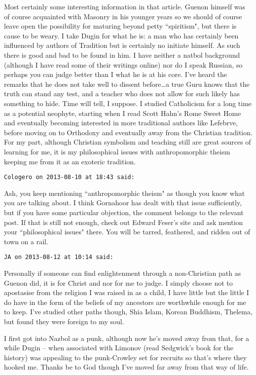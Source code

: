 \begin{footnotesize}
\begin{sffamily}
Most certainly some interesting information in that article. Guenon himself was of course acquainted with Masonry in his younger years so we should of course leave open the possibility for maturing beyond petty ``spiritism", but there is cause to be weary. I take Dugin for what he is: a man who has certainly been influenced by authors of Tradition but is certainly no initiate himself. As such there is good and bad to be found in him. I have neither a natbol background (although I have read some of their writings online) nor do I speak Russian, so perhaps you can judge better than I what he is at his core. I've heard the remarks that he does not take well to dissent before…a true Guru knows that the truth can stand any test, and a teacher who does not allow for such likely has something to hide. Time will tell, I suppose. I studied Catholicism for a long time as a potential neophyte, starting when I read Scott Hahn's Rome Sweet Home and eventually becoming interested in more traditional authors like Lefebrve, before moving on to Orthodoxy and eventually away from the Christian tradition. For my part, although Christian symbolism and teaching still are great sources of learning for me, it is my philosophical issues with anthropomorphic theism keeping me from it as an exoteric tradition.


\hfill

\texttt{Cologero on 2013-08-10 at 18:43 said: }

Ash, you keep mentioning ``anthropomorphic theism" as though you know what you are talking about. I think Gornahoor has dealt with that issue sufficiently, but if you have some particular objection, the comment belongs to the relevant post. If that is still not enough, check out Edward Feser's site and ask mention your ``philosophical issues" there. You will be tarred, feathered, and ridden out of town on a rail.


\hfill

\texttt{JA on 2013-08-12 at 10:14 said: }

Personally if someone can find enlightenment through a non-Christian path as Guenon did, it is for Christ and nor for me to judge. I simply choose not to apostasise from the religion I was raised in as a child, I have little but the little I do have in the form of the beliefs of my ancestors are worthwhile enough for me to keep. I've studied other paths though, Shia Islam, Korean Buddhism, Thelema, but found they were foreign to my soul. 

I first got into Nazbol as a punk, although now he's moved away from that, for a while Dugin – when associated with Limonov (read Sedgwick's book for the history) was appealing to the punk-Crowley set for recruits so that's where they hooked me. Thanks be to God though I've moved far away from that way of life. 


\end{sffamily}
\end{footnotesize}
